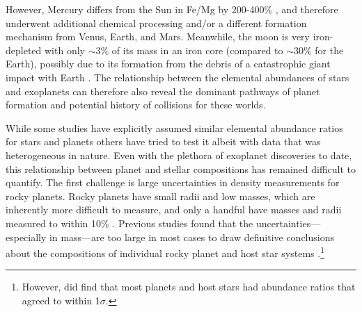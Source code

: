\documentclass[twocolumn]{aastex631}
\begin{document}



However, Mercury differs from the Sun in Fe/Mg by 200-400$\%$ \citep{1980PNAS...77.6973M, Ebel2018}, and therefore underwent additional chemical processing and/or a different formation mechanism from Venus, Earth, and Mars. Meanwhile, the moon is very iron-depleted with only $\sim$3$\%$ of its mass in an iron core \citep{2015LPICo1839.5001S} (compared to $\sim$30$\%$ for the Earth), possibly due to its formation from the debris of a catastrophic giant impact with Earth \citep{2001Natur.412..708C}. The relationship between the elemental abundances of stars and exoplanets can therefore also reveal the dominant pathways of planet formation and potential history of collisions for these worlds. 

While some studies have explicitly assumed similar elemental abundance ratios for stars and planets \citep{Dorn2015} others have tried to test it \citep{Plotnykov2020, Adibekyan2021, Schulze2021} albeit with data that was heterogeneous in nature. Even with the plethora of exoplanet discoveries to date, this relationship between planet and stellar compositions has remained difficult to quantify. The first challenge is large uncertainties in density measurements for rocky planets. Rocky planets have small radii and low masses, which are inherently more difficult to measure, and only a handful have masses and radii measured to within 10$\%$ \citep{2017NatAs...1E..56G, 2019ApJ...883...79D, 2020MNRAS.491.2982E, 2021PSJ.....2....1A, 2021Sci...371.1038T, 2021A&A...649A.144S, 2021NatAs...5..775D, Brinkman2023B, 2023A&A...677A..33B}. Previous studies found that the uncertainties---especially in mass---are too large in most cases to draw definitive conclusions about the compositions of individual rocky planet and host star systems \citep{Plotnykov2020, Schulze2021}.\footnote{However, \citet{Schulze2021} did find that most planets and host stars had abundance ratios that agreed to within 1$\sigma$.}
\end{document}
